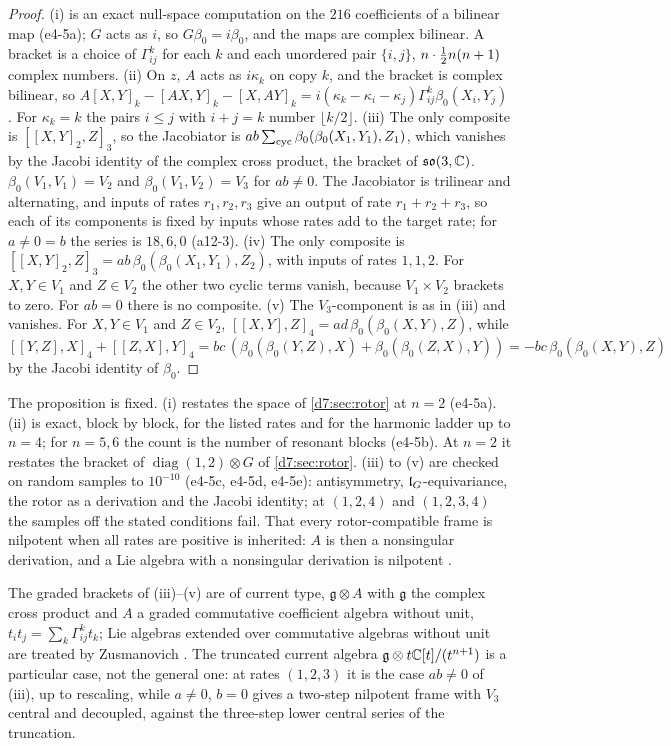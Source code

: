 \begin{proof}
(i) is an exact null-space computation on the $216$ coefficients of a bilinear map (e4-5a); $G$ acts as $i$, so $G\beta_0=i\beta_0$, and the maps are complex
bilinear. A bracket is a choice of $\Gamma^k_{ij}$ for each $k$ and each unordered pair $\{i,j\}$, $n\cdot\tfrac12 n(n+1)$ complex numbers. (ii) On $z$,
$A$ acts as $i\kappa_k$ on copy $k$, and the bracket is complex bilinear, so $A[X,Y]_k-[AX,Y]_k-[X,AY]_k=i(\kappa_k-\kappa_i-\kappa_j)\Gamma^k_{ij}\beta_0(X_i,Y_j)$. For
$\kappa_k=k$ the pairs $i\le j$ with $i+j=k$ number $\lfloor k/2\rfloor$. (iii) The only composite is $[[X,Y]_2,Z]_3$, so the Jacobiator is
$ab\sum_{\rm cyc}\beta_0(\beta_0(X_1,Y_1),Z_1)$, which vanishes by the Jacobi identity of the complex cross product, the bracket of $\mathfrak{so}(3,\mathbb{C})$.
$\beta_0(V_1,V_1)=V_2$ and $\beta_0(V_1,V_2)=V_3$ for $ab\neq0$. The Jacobiator is trilinear and alternating, and inputs of rates $r_1,r_2,r_3$ give an output of rate $r_1+r_2+r_3$, so each of its components is fixed
by inputs whose rates add to the target rate; for $a\neq0=b$ the series is $18,6,0$ (a12-3). (iv) The only composite is $[[X,Y]_2,Z]_3=ab\,\beta_0(\beta_0(X_1,Y_1),Z_2)$, with inputs of rates $1,1,2$. For $X,Y\in V_1$ and $Z\in V_2$
the other two cyclic terms vanish, because $V_1\times V_2$ brackets to zero. For $ab=0$ there is no composite. (v) The $V_3$-component is as in (iii)
and vanishes. For $X,Y\in V_1$ and $Z\in V_2$, $[[X,Y],Z]_4=ad\,\beta_0(\beta_0(X,Y),Z)$, while
$[[Y,Z],X]_4+[[Z,X],Y]_4=bc\,(\beta_0(\beta_0(Y,Z),X)+\beta_0(\beta_0(Z,X),Y))=-bc\,\beta_0(\beta_0(X,Y),Z)$ by the Jacobi identity of $\beta_0$.
\end{proof}

The proposition is fixed. (i) restates the space of \cref{d7:sec:rotor} at $n=2$ (e4-5a). (ii) is exact, block by block, for the listed rates and
for the harmonic ladder up to $n=4$; for $n=5,6$ the count is the number of resonant blocks (e4-5b). At $n=2$ it restates the bracket of
$\operatorname{diag}(1,2)\otimes G$ of \cref{d7:sec:rotor}. (iii) to (v) are checked on random samples to $10^{-10}$ (e4-5c, e4-5d, e4-5e):
antisymmetry, $\mathfrak l_G$-equivariance, the rotor as a derivation and the Jacobi identity; at $(1,2,4)$ and $(1,2,3,4)$ the samples off the stated
conditions fail. That every rotor-compatible frame is nilpotent when all rates are positive is inherited: $A$ is then a nonsingular derivation, and a
Lie algebra with a nonsingular derivation is nilpotent \cite{Jacobson55}.

The graded brackets of (iii)--(v) are of current type, $\mathfrak g\otimes A$ with $\mathfrak g$ the complex cross product and $A$ a graded commutative
coefficient algebra without unit, $t_it_j=\sum_k\Gamma^k_{ij}t_k$; Lie algebras extended over commutative algebras without unit are treated by
Zusmanovich \cite{Zusmanovich10}. The truncated current algebra $\mathfrak g\otimes t\mathbb{C}[t]/(t^{n+1})$ is a particular case, not the general one: at
rates $(1,2,3)$ it is the case $ab\neq0$ of (iii), up to rescaling, while $a\neq0$, $b=0$ gives a two-step nilpotent frame with $V_3$ central and
decoupled, against the three-step lower central series of the truncation.

